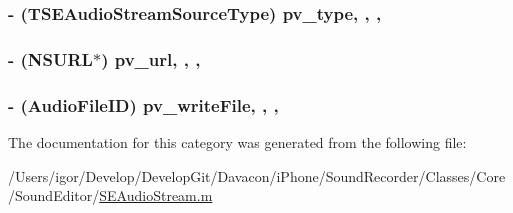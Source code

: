 \hypertarget{category_s_e_audio_stream_07_08_ab41d2bb3f3368b5d2e59f26bfb63f108}{
\subsubsection[{pv\-\_\-type}]{\setlength{\rightskip}{0pt plus 5cm}-\/ ({\bf T\-S\-E\-Audio\-Stream\-Source\-Type}) pv\-\_\-type\hspace{0.3cm}{\ttfamily [read]}, {\ttfamily [write]}, {\ttfamily [nonatomic]}, {\ttfamily [assign]}}}\label{category_s_e_audio_stream_07_08_ab41d2bb3f3368b5d2e59f26bfb63f108}
\hypertarget{category_s_e_audio_stream_07_08_ac5062bf935bfe512908c148b64ebaa84}{
\subsubsection[{pv\-\_\-url}]{\setlength{\rightskip}{0pt plus 5cm}-\/ (N\-S\-U\-R\-L$\ast$) pv\-\_\-url\hspace{0.3cm}{\ttfamily [read]}, {\ttfamily [write]}, {\ttfamily [nonatomic]}, {\ttfamily [strong]}}}\label{category_s_e_audio_stream_07_08_ac5062bf935bfe512908c148b64ebaa84}
\hypertarget{category_s_e_audio_stream_07_08_a63651ad03f9f237a9bce2449ad37de67}{
\subsubsection[{pv\-\_\-write\-File}]{\setlength{\rightskip}{0pt plus 5cm}-\/ (Audio\-File\-I\-D) pv\-\_\-write\-File\hspace{0.3cm}{\ttfamily [read]}, {\ttfamily [write]}, {\ttfamily [nonatomic]}, {\ttfamily [assign]}}}\label{category_s_e_audio_stream_07_08_a63651ad03f9f237a9bce2449ad37de67}


The documentation for this category was generated from the following file\-:\begin{DoxyCompactItemize}
\item 
/\-Users/igor/\-Develop/\-Develop\-Git/\-Davacon/i\-Phone/\-Sound\-Recorder/\-Classes/\-Core/\-Sound\-Editor/\hyperlink{_s_e_audio_stream_8m}{S\-E\-Audio\-Stream.\-m}\end{DoxyCompactItemize}
